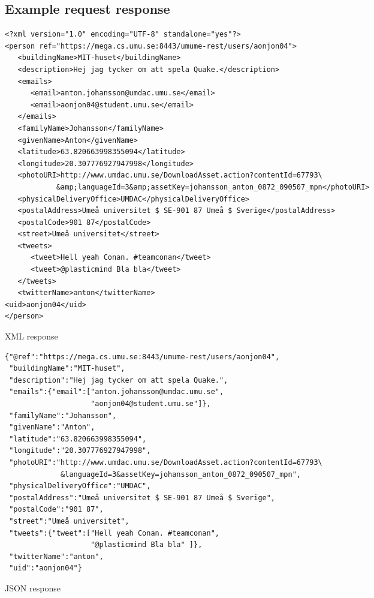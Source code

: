 \documentclass[titlepage, twocolumn, a4paper, 10pt]{article}
\begin{document}
\subsection{Example request response}\label{app:example-request-response}
\begin{code}
  \begin{footnotesize}
\begin{verbatim}
<?xml version="1.0" encoding="UTF-8" standalone="yes"?>
<person ref="https://mega.cs.umu.se:8443/umume-rest/users/aonjon04">
   <buildingName>MIT-huset</buildingName>
   <description>Hej jag tycker om att spela Quake.</description>
   <emails>
      <email>anton.johansson@umdac.umu.se</email>
      <email>aonjon04@student.umu.se</email>
   </emails>
   <familyName>Johansson</familyName>
   <givenName>Anton</givenName>
   <latitude>63.820663998355094</latitude>
   <longitude>20.307776927947998</longitude>
   <photoURI>http://www.umdac.umu.se/DownloadAsset.action?contentId=67793\
            &amp;languageId=3&amp;assetKey=johansson_anton_0872_090507_mpn</photoURI>
   <physicalDeliveryOffice>UMDAC</physicalDeliveryOffice>
   <postalAddress>Umeå universitet $ SE-901 87 Umeå $ Sverige</postalAddress>
   <postalCode>901 87</postalCode>
   <street>Umeå universitet</street>
   <tweets>
      <tweet>Hell yeah Conan. #teamconan</tweet>
      <tweet>@plasticmind Bla bla</tweet>
   </tweets>
   <twitterName>anton</twitterName>
<uid>aonjon04</uid>
</person>
\end{verbatim}
  \end{footnotesize}
  \caption{XML response}
\end{code}

\begin{code}
  \begin{footnotesize}
\begin{verbatim}
{"@ref":"https://mega.cs.umu.se:8443/umume-rest/users/aonjon04",
 "buildingName":"MIT-huset",
 "description":"Hej jag tycker om att spela Quake.",
 "emails":{"email":["anton.johansson@umdac.umu.se",
                    "aonjon04@student.umu.se"]},
 "familyName":"Johansson",
 "givenName":"Anton",
 "latitude":"63.820663998355094",
 "longitude":"20.307776927947998",
 "photoURI":"http://www.umdac.umu.se/DownloadAsset.action?contentId=67793\
             &languageId=3&assetKey=johansson_anton_0872_090507_mpn",
 "physicalDeliveryOffice":"UMDAC",
 "postalAddress":"Umeå universitet $ SE-901 87 Umeå $ Sverige",
 "postalCode":"901 87",
 "street":"Umeå universitet",
 "tweets":{"tweet":["Hell yeah Conan. #teamconan",
                    "@plasticmind Bla bla" ]},
 "twitterName":"anton",
 "uid":"aonjon04"}
\end{verbatim}
  \end{footnotesize}
  \caption{JSON response}
\end{code}
\end{document}
